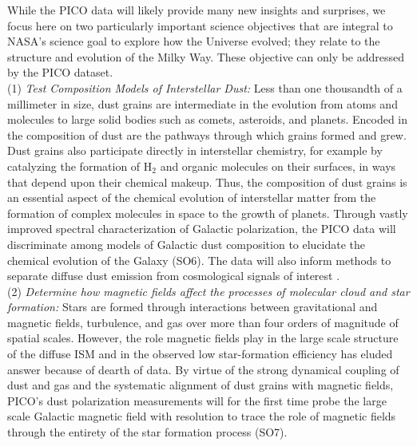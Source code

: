 \documentclass[PICOReport.tex]{subfiles}
\begin{document}
While the PICO data will likely provide many new insights and surprises, we focus here on two particularly important science objectives that are integral to NASA's science goal to explore how the Universe evolved; they relate to the structure and evolution of the Milky Way. These objective can only be addressed by the PICO dataset. \\
(1) {\em Test Composition Models of Interstellar Dust:} 
Less than one thousandth of a millimeter in size, dust grains are intermediate in the evolution from atoms and molecules to large solid bodies such as comets, asteroids, and planets. Encoded in the composition of dust are the pathways through which grains formed and grew. Dust grains also participate directly in interstellar chemistry, for example by catalyzing the formation of H$_2$ and organic molecules on their surfaces, in ways that depend upon their chemical makeup. Thus, the composition of dust grains is an essential aspect of the chemical evolution of interstellar matter from the formation of complex molecules in space to the growth of planets. Through vastly improved spectral characterization of Galactic polarization, the PICO data will discriminate among models of Galactic dust composition to elucidate the chemical evolution of the Galaxy (SO6). The data will also inform methods to separate diffuse dust emission from cosmological signals of interest . \\
%
(2) {\em Determine how magnetic fields affect the processes of molecular cloud and star formation:}
Stars are formed through interactions between gravitational and magnetic fields, turbulence, and gas over more than four orders of magnitude of spatial scales. However, the role magnetic fields play in the large scale structure of the diffuse \ac{ISM} and in the observed low star-formation efficiency has eluded answer because of dearth of data. 
By virtue of the strong dynamical coupling of dust and gas and the systematic alignment of dust grains with magnetic fields, PICO's dust polarization measurements will for the first time probe the large scale Galactic magnetic field with resolution to trace the role of magnetic fields through the entirety of the star formation process (SO7). 
\end{document}
